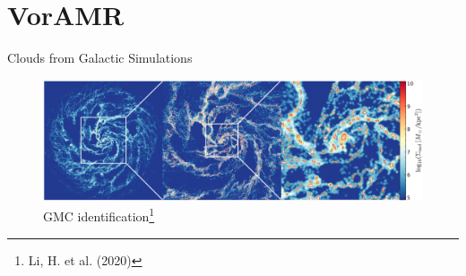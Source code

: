 \documentclass[aspectratio=169]{beamer}
\begin{document}
\section{VorAMR}
%
%
% 
\begin{frame}{Clouds from Galactic Simulations}
	\begin{figure}[h!]
                \centering
                \includegraphics[width=\linewidth]{../images/AREPO_galaxy.png} \\
                GMC identification\footnote{Li, H. et al. (2020)}
                \label{fig:arepo_galaxy}
	\end{figure}
\end{frame}
%
%
%
%
%
\end{document}
